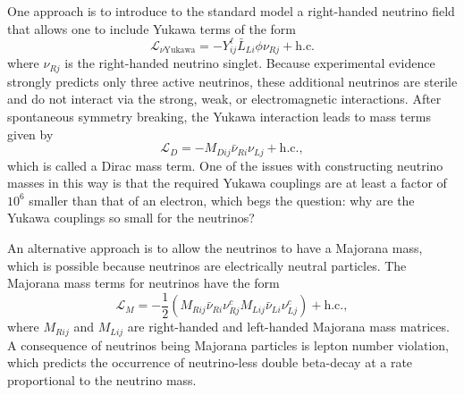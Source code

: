 One approach is to introduce to the standard model a right-handed neutrino field that allows one to include Yukawa terms of the form 
\begin{equation}
    \mathcal{L}_{\nu\textrm{Yukawa}} = -Y^\ell_{ij}\bar{L}_{Li}\phi \nu_{Rj}+\textrm{h.c.}
\end{equation}
where $\nu_{Rj}$ is the right-handed neutrino singlet. Because experimental evidence strongly predicts only three active neutrinos, these additional neutrinos are sterile and do not interact via the strong, weak, or electromagnetic interactions. After spontaneous symmetry breaking, the Yukawa interaction leads to mass terms given by 
\begin{equation}
    \mathcal{L}_{D}=-M_{Dij}\bar{\nu}_{Ri}\nu_{Lj} +\textrm{h.c.},
\end{equation}
which is called a Dirac mass term. One of the issues with constructing neutrino masses in this way is that the required Yukawa couplings are at least a factor of $10^6$ smaller than that of an electron, which begs the question: why are the Yukawa couplings so small for the neutrinos?

An alternative approach is to allow the neutrinos to have a Majorana mass, which is possible because neutrinos are electrically neutral particles. The Majorana mass terms for neutrinos have the form 
\begin{equation}
    \mathcal{L}_{M}=-\frac{1}{2}(M_{Rij}\bar{\nu}_{Ri}\nu_{Rj}^c M_{Lij}\bar{\nu}_{Li}\nu_{Lj}^c) +\textrm{h.c.},
\end{equation}
where $M_{Rij}$ and $M_{Lij}$ are right-handed and left-handed Majorana mass matrices. A consequence of neutrinos being Majorana particles is lepton number violation, which predicts the occurrence of neutrino-less double beta-decay at a rate proportional to the neutrino mass.

